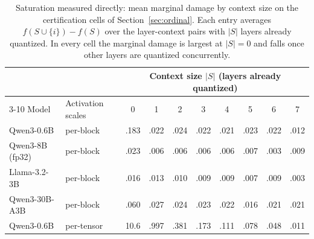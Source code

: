 \begin{table}[t]
  \centering
  \small
  \begin{tabular}{llcccccccc}
    \toprule
    & & \multicolumn{8}{c}{Context size $|S|$ (layers already quantized)} \\
    \cmidrule(lr){3-10}
    Model & Activation scales & 0 & 1 & 2 & 3 & 4 & 5 & 6 & 7 \\
    \midrule
    Qwen3-0.6B & per-block & .183 & .022 & .024 & .022 & .021 & .023 & .022 & .012 \\
    Qwen3-8B (fp32) & per-block & .023 & .006 & .006 & .006 & .006 & .007 & .003 & .009 \\
    Llama-3.2-3B & per-block & .016 & .013 & .010 & .009 & .009 & .007 & .009 & .003 \\
    Qwen3-30B-A3B & per-block & .060 & .027 & .024 & .023 & .022 & .016 & .021 & .021 \\
    Qwen3-0.6B & per-tensor & 10.6 & .997 & .381 & .173 & .111 & .078 & .048 & .011 \\
    \bottomrule
  \end{tabular}
  \caption{Saturation measured directly: mean marginal damage by context size on the certification
  cells of Section~\ref{sec:ordinal}. Each
  entry averages $f(S\cup\{i\}) - f(S)$ over the layer-context pairs with $|S|$ layers already
  quantized. In every cell the marginal damage is largest at $|S|=0$ and falls once other layers are
  quantized concurrently.}
  \label{tab:marginals}
\end{table}

